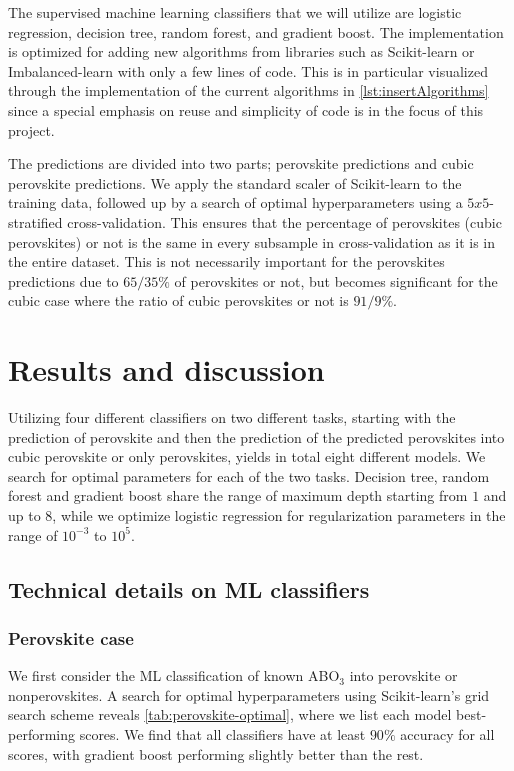 The supervised machine learning classifiers that we will utilize are logistic regression, decision tree, random forest, and gradient boost. The implementation is optimized for adding new algorithms from libraries such as Scikit-learn \cite{Pedregosa2012} or Imbalanced-learn \cite{Lemaitre2016} with only a few lines of code. This is in particular visualized through the implementation of the current algorithms in \autoref{lst:insertAlgorithms} since a special emphasis on reuse and simplicity of code is in the focus of this project.

The predictions are divided into two parts; perovskite predictions and cubic perovskite predictions. We apply the standard scaler of Scikit-learn \cite{Pedregosa2012} to the training data, followed up by a search of optimal hyperparameters using a $5x5$-stratified cross-validation. This ensures that the percentage of perovskites (cubic perovskites) or not is the same in every subsample in cross-validation as it is in the entire dataset. This is not necessarily important for the perovskites predictions due to $65/35 \%$ of perovskites or not, but becomes significant for the cubic case where the ratio of cubic perovskites or not is $91/9\%$.

\section{Results and discussion}

Utilizing four different classifiers on two different tasks, starting with the prediction of perovskite and then the prediction of the predicted perovskites into cubic perovskite or only perovskites, yields in total eight different models. We search for optimal parameters for each of the two tasks. Decision tree, random forest and gradient boost share the range of maximum depth starting from $1$ and up to $8$, while we optimize logistic regression for regularization parameters in the range of $10^{-3}$ to $10^5$.

\subsection{Technical details on ML classifiers}

\subsubsection{Perovskite case}
We first consider the ML classification of known ABO$_3$ into perovskite or nonperovskites. A search for optimal hyperparameters using Scikit-learn's grid search scheme \cite{Pedregosa2012} reveals \autoref{tab:perovskite-optimal}, where we list each model best-performing scores. We find that all classifiers have at least $90\%$ accuracy for all scores, with gradient boost performing slightly better than the rest.

